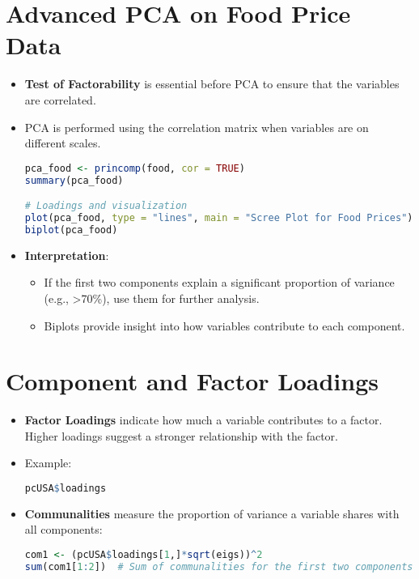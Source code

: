 \section{Advanced PCA on Food Price Data}
\begin{itemize}
    \item \textbf{Test of Factorability} is essential before PCA to ensure that the variables are correlated.
    \item PCA is performed using the correlation matrix when variables are on different scales.
\begin{lstlisting}[language=R]
pca_food <- princomp(food, cor = TRUE)
summary(pca_food)

# Loadings and visualization
plot(pca_food, type = "lines", main = "Scree Plot for Food Prices")
biplot(pca_food)
\end{lstlisting}

\item \textbf{Interpretation}:
    \begin{itemize}
        \item If the first two components explain a significant proportion of variance (e.g., >70\%), use them for further analysis.
        \item Biplots provide insight into how variables contribute to each component.
    \end{itemize}
\end{itemize}

\section{Component and Factor Loadings}
\begin{itemize}
    \item \textbf{Factor Loadings} indicate how much a variable contributes to a factor. Higher loadings suggest a stronger relationship with the factor.
    \item Example:
\begin{lstlisting}[language=R]
pcUSA$loadings
\end{lstlisting}

\item \textbf{Communalities} measure the proportion of variance a variable shares with all components:
\begin{lstlisting}[language=R]
com1 <- (pcUSA$loadings[1,]*sqrt(eigs))^2
sum(com1[1:2])  # Sum of communalities for the first two components
\end{lstlisting}
\end{itemize}

